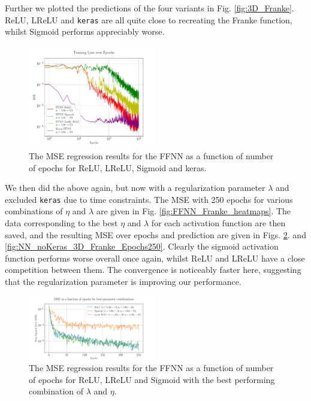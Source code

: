 \documentclass[%
reprint,s
amsmath,amssymb,
aps,
]{revtex4-2}
\begin{document}
Further we plotted the predictions of the four variants in Fig. \ref{fig:3D_Franke}. ReLU, LReLU and \texttt{keras} are all quite close to recreating the Franke function, whilst Sigmoid performs appreciably worse.
\begin{figure}[ht!]
	\includegraphics[width=0.5\textwidth]{Figures/NN_MSE_Franke_Epoch.pdf}
	\caption{The MSE regression results for the FFNN as a function of number of epochs for ReLU, LReLU, Sigmoid and keras.}
	\label{fig:NN_Franke_Epochs}
\end{figure}

We then did the above again, but now with a regularization parameter $\lambda$ and excluded \texttt{keras} due to time constraints. The MSE with 250 epochs for various combinations of $\eta$ and $\lambda$ are given in Fig. \ref{fig:FFNN_Franke_heatmaps}. The data corresponding to the best $\eta$ and $\lambda$ for each activation function are then saved, and the resulting MSE over epochs and prediction are given in Figs. \ref{fig:best_MSE_Franke_Epochs}. and \ref{fig:NN_noKeras_3D_Franke_Epochs250}. Clearly the sigmoid activation function performs worse overall once again, whilst ReLU and LReLU have a close competition between them. The convergence is noticeably faster here, suggesting that the regularization parameter is improving our performance.
\begin{figure}[ht!]
	\includegraphics[width=0.5\textwidth]{Figures/Best_MSE_vs_Epochs250.pdf}
	\caption{The MSE regression results for the FFNN as a function of number of epochs for ReLU, LReLU and Sigmoid with the best performing combination of $\lambda$ and $\eta$.}
	\label{fig:best_MSE_Franke_Epochs}
\end{figure}
\end{document}
